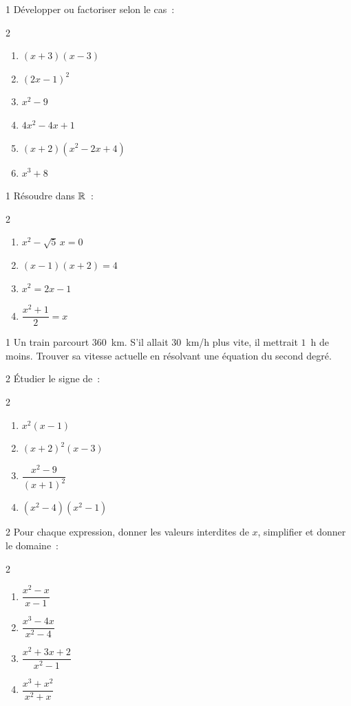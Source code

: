 \begin{exo}{1}
D\'evelopper ou factoriser selon le cas~:
\begin{multicols}{2}
\begin{enumerate}
  \item $(x+3)(x-3)$
  \item $(2x-1)^2$
  \item $x^2-9$
  \item $4x^2-4x+1$
  \item $(x+2)(x^2-2x+4)$
  \item $x^3+8$
\end{enumerate}
\end{multicols}
\end{exo}

\begin{exo}{1}
R\'esoudre dans $\mathbb{R}$~:
\begin{multicols}{2}
\begin{enumerate}
  \item $x^2 - \sqrt{5}\,x = 0$
  \item $(x-1)(x+2)=4$
  \item $x^2 = 2x - 1$
  \item $\dfrac{x^2+1}{2} = x$
\end{enumerate}
\end{multicols}
\end{exo}

\begin{exo}{1}
Un train parcourt $360$~km. S'il allait $30$~km/h plus vite, il mettrait
$1$~h de moins. Trouver sa vitesse actuelle en r\'esolvant une \'equation
du second degr\'e.
\end{exo}

\begin{exo}{2}
\'Etudier le signe de~:
\begin{multicols}{2}
\begin{enumerate}
  \item $x^2(x-1)$
  \item $(x+2)^2(x-3)$
  \item $\dfrac{x^2-9}{(x+1)^2}$
  \item $(x^2-4)(x^2-1)$
\end{enumerate}
\end{multicols}
\end{exo}

\begin{exo}{2}
Pour chaque expression, donner les valeurs interdites de $x$,
simplifier et donner le domaine~:
\begin{multicols}{2}
\begin{enumerate}
  \item $\dfrac{x^2-x}{x-1}$
  \item $\dfrac{x^3-4x}{x^2-4}$
  \item $\dfrac{x^2+3x+2}{x^2-1}$
  \item $\dfrac{x^3+x^2}{x^2+x}$
\end{enumerate}
\end{multicols}
\end{exo}


